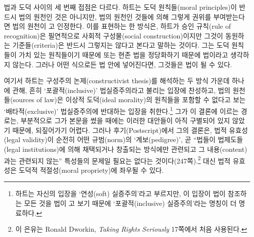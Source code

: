 법과 도덕 사이의 세 번째 접점은 다르다. 하트는 도덕 원칙들(moral
principles)이 반드시 법의 원천인 것은 아니지만, 법의 원천인 것들에 의해
그렇게 권위를 부여받는다면 법의 원천이 고
인정한다. 이를 표현하는 한 방식은, 하트가 승인 규칙(rule of
recognition)은 필연적으로 사회적 구성물(social construction)이지만
그것이 동원하는 기준들(criteria)은 반드시 그렇지는 않다고 본다고 말하는
것이다. 그는 도덕 원칙들이 가치 있는 원칙들이기 때문에 또는 현존 법을
정당화하기 때문에 법이라고 생각하지 않는다. 그러나 어떤 식으로든 법 안에
넣어진다면, 그것들은 법이 될 수 있다.

여기서 하트는 구성주의 논제(constructivist thesis)를 해석하는 두 방식
가운데 하나에 관해, 흔히 ‘포괄적(inclusive)’ 법실증주의라고 불리는
입장에 찬성하고, 법의 원천들(sources of law)은 이상적 도덕(ideal
morality)의 원칙들을 포함할 수 없다고 보는 ‘배타적(exclusive)’
법실증주의에 반대하는 입장을 취한다.\footnote{하트는 자신의 입장을
  ‘연성(soft) 실증주의’라고 부르지만, 이 입장이 법이 참조하는 모든 것을
  법이 고 보기 때문에 ‘포괄적(inclusive) 실증주의’라는
  명칭이 더 명료하다.} 그가 이 결론에 이르는 경로는, 부분적으로 그가
본문을 썼을 때에는 이러한 대안들이 아직 구별되어 있지 않았기 때문에,
되짚어가기 어렵다. 그러나 후기(Postscript)에서 그의 결론은, 법적
유효성(legal validity)이 순전히 어떤 규범(norm)의 ‘계보(pedigree)’, 곧
“법들이 법제도들(legal institutions)에 의해 채택되거나 창출되는
방식에만 관련되고 그 내용(content)과는 관련되지 않는” 특성들의 문제일
필요는 없다는 것이다(247쪽).\footnote{이 은유는 Ronald Dworkin,
  \emph{Taking Rights Seriously} 17쪽에서 처음 사용된다.} 대신 법적
유효성은 도덕적 적절성(moral propriety)에 좌우될 수 있다.

